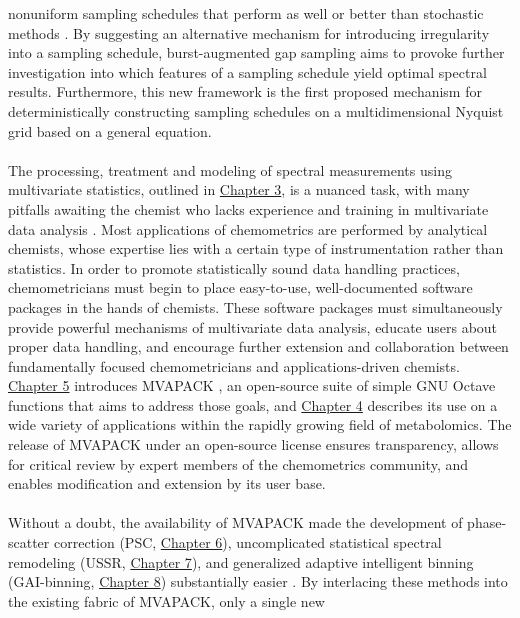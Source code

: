 \begin{doublespace}
nonuniform sampling schedules that perform as well or better than stochastic
methods \cite{worley:jmr2015}. By suggesting an alternative mechanism for
introducing irregularity into a sampling schedule, burst-augmented gap
sampling aims to provoke further investigation into which features of a
sampling schedule yield optimal spectral results. Furthermore, this new
framework is the first proposed mechanism for deterministically constructing
sampling schedules on a multidimensional Nyquist grid \cite{eddy:jmr2012}
based on a general equation.
\\\\
The processing, treatment and modeling of spectral measurements using
multivariate statistics, outlined in \hyperlink{chapter.3}{Chapter 3},
is a nuanced task, with many pitfalls awaiting the chemist who lacks
experience and training in multivariate data analysis
\cite{worley:cmb2013,worley:anchem2015}. Most applications of chemometrics
are performed by analytical chemists, whose expertise lies with a certain
type of instrumentation rather than statistics. In order to promote
statistically sound data handling practices, chemometricians
must begin to place easy-to-use, well-documented software packages in the
hands of chemists. These software packages must simultaneously provide
powerful mechanisms of multivariate data analysis, educate users about
proper data handling, and encourage further extension and collaboration
between fundamentally focused chemometricians and applications-driven
chemists. \hyperlink{chapter.5}{Chapter 5} introduces MVAPACK
\cite{worley:acscb2014}, an open-source suite of simple GNU Octave
\cite{eaton2008} functions that aims to address those goals, and
\hyperlink{chapter.4}{Chapter 4} describes its use on a wide variety of
applications within the rapidly growing field of metabolomics. The release
of MVAPACK under an open-source license ensures transparency, allows for
critical review by expert members of the chemometrics community, and
enables modification and extension by its user base.
\\\\
Without a doubt, the availability of MVAPACK made the development of
phase-scatter correction
(PSC, \hyperlink{chapter.6}{Chapter 6}),
uncomplicated statistical spectral remodeling
(USSR, \hyperlink{chapter.7}{Chapter 7}),
and generalized adaptive intelligent binning
(GAI-binning, \hyperlink{chapter.8}{Chapter 8})
substantially easier
\cite{worley:cils2014,worley:jbnmr2015,worley:cils2015}. By interlacing
these methods into the existing fabric of MVAPACK, only a single new

\end{doublespace}
